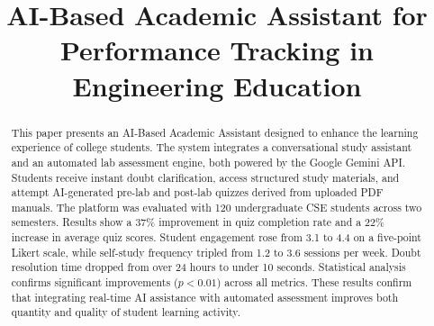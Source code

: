 \documentclass[conference]{IEEEtran}
\begin{document}
\title{AI-Based Academic Assistant for Performance Tracking in Engineering Education}

\author{
\and
{}
\and
{}
\and
{}
}

\maketitle

\begin{abstract}
This paper presents an AI-Based Academic Assistant designed to enhance the learning experience of college students. The system integrates a conversational study assistant and an automated lab assessment engine, both powered by the Google Gemini API. Students receive instant doubt clarification, access structured study materials, and attempt AI-generated pre-lab and post-lab quizzes derived from uploaded PDF manuals. The platform was evaluated with 120 undergraduate CSE students across two semesters. Results show a 37\% improvement in quiz completion rate and a 22\% increase in average quiz scores. Student engagement rose from 3.1 to 4.4 on a five-point Likert scale, while self-study frequency tripled from 1.2 to 3.6 sessions per week. Doubt resolution time dropped from over 24 hours to under 10 seconds. Statistical analysis confirms significant improvements ($p < 0.01$) across all metrics. These results confirm that integrating real-time AI assistance with automated assessment improves both quantity and quality of student learning activity.
\end{abstract}
\end{document}
